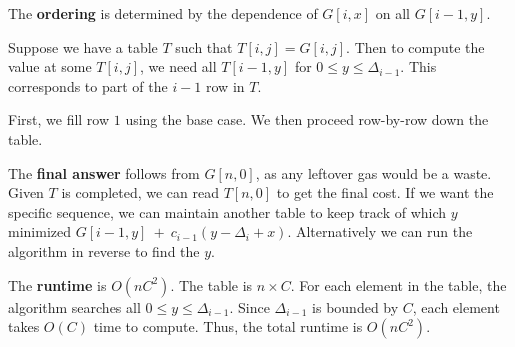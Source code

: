 \documentclass[10pt]{article}
\begin{document}
\begin{solution}
\begin{enumerate}[(a)]
{        The \textbf{ordering} is determined by the dependence of $G[i,x]$ on 
        all $G[i-1,y]$. 

        Suppose we have a table $T$ such that $T[i,j] = G[i, j]$. 
        Then to compute the value at some $T[i,j]$, we need all $T[i-1, y]$ for 
        $0 \leq y \leq \Delta_{i-1}$. 
        This corresponds to part of the $i-1$ row in $T$. 

        First, we fill row $1$ using the base case. 
        We then proceed row-by-row down the table. 

        The \textbf{final answer} follows from $G[n, 0]$, as any leftover gas 
        would be a waste. 
        Given $T$ is completed, we can read $T[n, 0]$ to get the final cost. 
        If we want the specific sequence, we can maintain another table to keep 
        track of which $y$ minimized 
        $G[i-1, y] \: + \: c_{i-1}(y - \Delta_i + x)$. 
        Alternatively we can run the algorithm in reverse to find the $y$. 

        The \textbf{runtime} is $O(nC^2)$. 
        The table is $n \times C$. 
        For each element in the table, the algorithm searches all 
        $0 \leq y \leq \Delta_{i-1}$. 
        Since $\Delta_{i-1}$ is bounded by $C$, each element takes $O(C)$ time 
        to compute. 
        Thus, the total runtime is $O(nC^2)$. 


    }
\end{enumerate}

\end{solution}


\newpage


\end{document}
